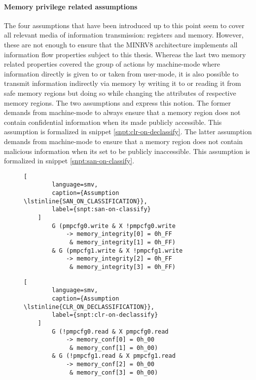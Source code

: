 \paragraph{Memory privilege related assumptions}
The four assumptions that have been introduced up to this point seem to cover all relevant media of information transmission: registers and memory.
However, these are not enough to ensure that the MINRV8 architecture implements all information flow properties subject to this thesis.
Whereas the last two memory related properties covered the group of actions by machine-mode where information directly is given to or taken from user-mode, it is also possible to transmit information indirectly via memory by writing it to or reading it from safe memory regions but doing so while changing the attributes of respective memory regions.
The two assumptions  and  express this notion.
The former demands from machine-mode to always ensure that a memory region does not contain confidential information when its made publicly accessible.
This assumption is formalized in snippet \ref{snpt:clr-on-declassify}.
The latter assumption demands from machine-mode to ensure that a memory region does not contain malicious information when its set to be publicly inaccessible.
This assumption is formalized in snippet \ref{snpt:san-on-classify}.

\begin{figure}
    \begin{lstlisting}[
        language=smv,
        caption={Assumption \lstinline{SAN_ON_CLASSIFICATION}},
        label={snpt:san-on-classify}
    ]
        G (pmpcfg0.write & X !pmpcfg0.write
            -> memory_integrity[0] = 0h_FF
             & memory_integrity[1] = 0h_FF)
        & G (pmpcfg1.write & X !pmpcfg1.write
            -> memory_integrity[2] = 0h_FF
             & memory_integrity[3] = 0h_FF)
    \end{lstlisting}

    \begin{lstlisting}[
        language=smv,
        caption={Assumption \lstinline{CLR_ON_DECLASSIFICATION}},
        label={snpt:clr-on-declassify}
    ]
        G (!pmpcfg0.read & X pmpcfg0.read
            -> memory_conf[0] = 0h_00
             & memory_conf[1] = 0h_00)
        & G (!pmpcfg1.read & X pmpcfg1.read
            -> memory_conf[2] = 0h_00
             & memory_conf[3] = 0h_00)
    \end{lstlisting}
\end{figure}

